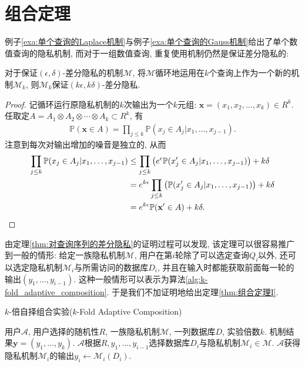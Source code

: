 \section{组合定理} %
\label{sec:组合定理}
例子\ref{exa:单个查询的Laplace机制}与例子\ref{exa:单个查询的Gauss机制}给出了单个数值查询的隐私机制, 而对于一组数值查询, 重复使用机制仍然是保证差分隐私的:

\begin{thm}\label{thm:对查询序列的差分隐私}
  对于保证$(\epsilon, \delta)$-差分隐私的机制$\mathcal{M}$, 将$\mathcal{M}$循环地运用在$k$个查询上作为一个新的机制$\mathcal{M}_k$, 则$\mathcal{M}_k$保证$(k\epsilon, k\delta)$-差分隐私.
\end{thm}
\begin{proof}
  记循环运行原隐私机制的$k$次输出为一个$k$元组: $\mathbf{x} = (x_1, x_2, \dots, x_k) \in R^k$. 任取定$A = A_1\otimes A_2 \otimes \cdots \otimes A_k\subset R^k$, 有
  \[
  \begin{split}
    \mathbb P(\mathbf{x} \in A) = \prod_{j\le k}\mathbb P(x_j \in A_j| x_1, \dots, x_{j-1}).
  \end{split}
  \]
  注意到每次对输出增加的噪音是独立的, 从而
  \begin{align*}
    \prod_{j\le k}\mathbb P(x_j \in A_j| x_1, \dots, x_{j-1}) &\le \prod_{j\le k} \left( e^\epsilon \mathbb P(x_j' \in A_j | x_1, \dots, x_{j-1})\right) + k \delta \\
    &= e^{k\epsilon} \prod_{j\le k} \left( \mathbb P(x_j' \in A_j | x_1, \dots, x_{j-1})\right) + k\delta \\
    &= e^{k\epsilon} \mathbb P(\mathbf{x}' \in A) + k\delta. \qedhere
  \end{align*}
\end{proof}
由定理\ref{thm:对查询序列的差分隐私}的证明过程可以发现, 该定理可以很容易推广到一般的情形: 给定一族隐私机制$\mathcal{M}$, 用户在第$i$轮除了可以选定查询$Q_i$以外, 还可以选定隐私机制$\mathcal{M}_i$与所需访问的数据库$D_i$, 并且在输入时都能获取前面每一轮的输出$(y_1, \dots, y_{i-1})$. 这种一般情形可以表示为算法\ref{alg:k-fold_adaptive_composition}. 于是我们不加证明地给出定理\ref{thm:组合定理I}.
\begin{algorithm}[hbtp]
  \caption{$k$-倍自择组合实验($k$-Fold Adaptive Composition)}\label{alg:k-fold_adaptive_composition}
  \begin{algorithmic}[1]
    \REQUIRE 用户$\mathcal{A}$, 用户选择的随机性$R$, 一族隐私机制$\mathcal{M}$, 一列数据库$D$, 实验倍数$k$.
    \ENSURE 机制结果$\mathbf{y} = (y_1, \dots, y_k)$.
    \STATE $\mathcal{A}$根据$R,y_1,\dots,y_{i-1}$选择数据库$D_i$与隐私机制$\mathcal{M}_i\in\mathcal{M}$.
    \STATE $\mathcal{A}$获得隐私机制$\mathcal{M}_i$的输出$y_i \leftarrow \mathcal{M}_i(D_i)$.
    \ENDFOR
  \end{algorithmic}
\end{algorithm}
